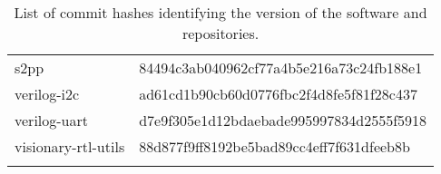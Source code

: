 \documentclass[10.5pt,a4paper,DIV=15]{scrartcl}
\renewcommand\footnote[1]{}
\begin{document}
\begin{table}[H]
\begin{tabular}{l >{\ttfamily}l}
s2pp & 84494c3ab040962cf77a4b5e216a73c24fb188e1 \\

verilog-i2c\footnote{\url{https://github.com/electronicvisions/verilog-i2c}} & ad61cd1b90cb60d0776fbc2f4d8fe5f81f28c437 \\

verilog-uart\footnote{\url{https://github.com/electronicvisions/verilog-uart}} & d7e9f305e1d12bdaebade995997834d2555f5918 \\

visionary-rtl-utils & 88d877f9ff8192be5bad89cc4eff7f631dfeeb8b \\
\bottomrule{}
\end{tabular}
\caption{List of commit hashes identifying the version of the software and \FPGA{} repositories.}\label{tbl:commit_hashes}
\end{table}
\end{document}
